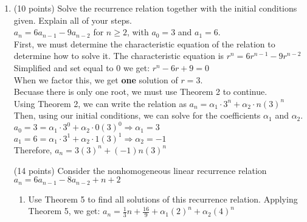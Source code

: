 \documentclass[12pt, letterpaper]{article}
\begin{document}
\begin{flushleft}
\begin{enumerate}
  \item (10 points) Solve the recurrence relation together with the initial conditions given. Explain all of your steps. \\
    \smallskip
    $a_n = 6a_{n-1} - 9a_{n-2}$ for $n \geq 2$, with $a_0 = 3$ and $a_1 = 6$. \\
    \medskip
    First, we must determine the characteristic equation of the relation to determine how to solve it. The characteristic equation is $r^n = 6r^{n-1} - 9r^{n-2}$ \\
    Simplified and set equal to 0 we get: $r^n - 6r + 9 = 0$ \\
    When we factor this, we get \textbf{one} solution of $r = 3$. \\
    Becuase there is only one root, we must use Theorem 2 to continue. \\
    Using Theorem 2, we can write the relation as
    $a_n = \alpha_1 \cdot 3^n + \alpha_2 \cdot n(3)^n$ \\
    Then, using our initial conditions, we can solve for the coefficients $\alpha_1$ and $\alpha_2$. \\
    $a_0 = 3 = \alpha_1 \cdot 3^0 + \alpha_2 \cdot 0(3)^0 \Rightarrow \alpha_1 = 3$ \\
    $a_1 = 6 = \alpha_1 \cdot 3^1 + \alpha_2 \cdot 1(3)^1 \Rightarrow \alpha_2 = -1$ \\
    Therefore, $a_n = 3(3)^n + (-1)n(3)^n$ \\
    \smallskip
  \begin{item} (14 points) Consider the nonhomogeneous linear recurrence relation
    \center $a_n = 6a_{n-1} - 8a_{n-2} + n + 2$ \\
    \begin{enumerate}
    \begin{item} Show that $a_n = \frac{1}{3}n + \frac{16}{9}$ is a solution of this recurrence relation. \\
      \smallskip
      We have to plug the above solution into our original relation and simplify: \\
      \center $a_n = 6(\frac{1}{3}(n-1)+\frac{16}{9})-8(\frac{1}{3}(n-2)+\frac{16}{9})+n+2$ \\
      \center $ = \frac{1}{3}n + \frac{16}{9}$ \\
    \end{item}
    \item Use Theorem 5 to find all solutions of this recurrence relation.
      \smallskip
      Applying Theorem 5, we get:
      $a_n = \frac{1}{3}n + \frac{16}{9} + \alpha_1(2)^n + \alpha_2(4)^n$ \\

\end{enumerate}
\end{item}
\end{enumerate}
\end{flushleft}
\end{document}
